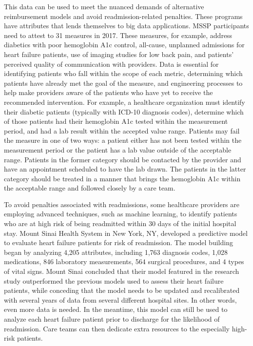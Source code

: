 \documentclass[sigconf]{acmart}
\begin{document}
 This data can be used to meet the nuanced demands of alternative reimbursement models and avoid readmission-related penalties. These programs have attributes that lends themselves to big data applications. MSSP participants need to attest to 31 measures in 2017. These measures, for example, address diabetics with poor hemoglobin A1c control, all-cause, unplanned admissions for heart failure patients, use of imaging studies for low back pain, and patients' perceived quality of communication with providers\cite{editor07}. Data is essential for identifying patients who fall within the scope of each metric, determining which patients have already met the goal of the measure, and engineering processes to help make providers aware of the patients who have yet to receive the recommended intervention. For example, a healthcare organization must identify their diabetic patients (typically with ICD-10 diagnosis codes), determine which of those patients had their hemoglobin A1c tested within the measurement period, and had a lab result within the accepted value range. Patients may fail the measure in one of two ways: a patient either has not been tested within the measurement period or the patient has a lab value outside of the acceptable range. Patients in the former category should be contacted by the provider and have an appointment scheduled to have the lab drawn. The patients in the latter category should be treated in a manner that brings the hemoglobin A1c within the acceptable range and followed closely by a care team.

 To avoid penalties associated with readmissions, some healthcare providers are employing advanced techniques, such as machine learning, to identify patients who are at high risk of being readmitted within 30 days of the initial hospital stay. Mount Sinai Health System in New York, NY, developed a predictive model to evaluate heart failure patients for risk of readmission. The model building began by analyzing 4,205 attributes, including 1,763 diagnosis codes, 1,028 medications, 846 laboratory measurements, 564 surgical procedures, and 4 types of vital signs\cite{editor08}. Mount Sinai concluded that their model featured in the research study outperformed the previous models used to assess their heart failure patients, while conceding that the model needs to be updated and recalibrated with several years of data from several different hospital sites\cite{editor08}. In other words, even more data is needed. In the meantime, this model can still be used to analyze each heart failure patient prior to discharge for the likelihood of readmission. Care teams can then dedicate extra resources to the especially high-risk patients.
\end{document}
